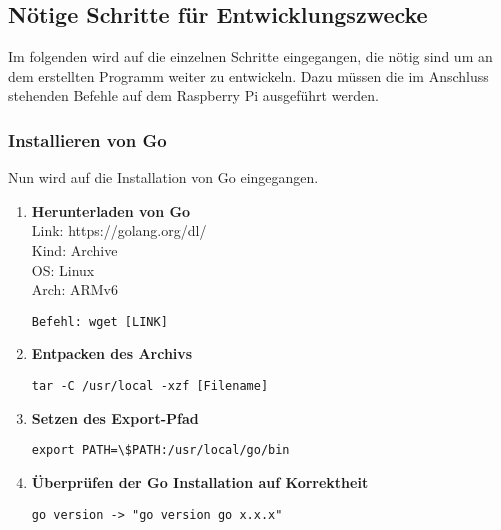 \subsection{Nötige Schritte für Entwicklungszwecke}
Im folgenden wird auf die einzelnen Schritte eingegangen, die nötig sind um an dem erstellten Programm weiter zu entwickeln. Dazu müssen die im Anschluss stehenden Befehle auf dem Raspberry Pi ausgeführt werden.
\subsubsection{Installieren von Go}
Nun wird auf die Installation von Go eingegangen.
\begin{enumerate}
\item \textbf{Herunterladen von Go}  \\
Link: https://golang.org/dl/ \\
Kind: Archive \\
OS: Linux \\
Arch: ARMv6
\begin{lstlisting}
Befehl: wget [LINK]
\end{lstlisting}

\item \textbf{Entpacken des Archivs}  \\
\begin{lstlisting}
tar -C /usr/local -xzf [Filename]
\end{lstlisting}

\item \textbf{Setzen des Export-Pfad} \\
\begin{lstlisting}
export PATH=\$PATH:/usr/local/go/bin
\end{lstlisting}

\item \textbf{Überprüfen der Go Installation auf Korrektheit} \\
\begin{lstlisting}
go version -> "go version go x.x.x"
\end{lstlisting}


\end{enumerate}
